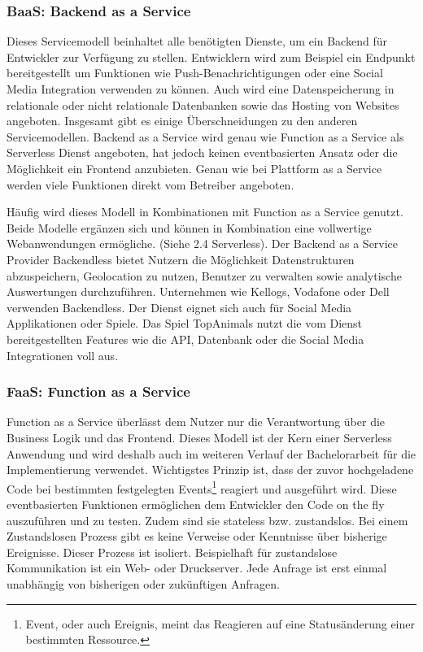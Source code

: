    \subsubsection{BaaS: Backend as a Service}
   Dieses Servicemodell beinhaltet alle benötigten Dienste, um ein Backend für Entwickler zur Verfügung zu stellen.
   Entwicklern wird zum Beispiel ein Endpunkt bereitgestellt um Funktionen wie Push-Benachrichtigungen oder eine Social Media Integration verwenden zu können.
   Auch wird eine Datenspeicherung in relationale oder nicht relationale Datenbanken sowie das Hosting von Websites angeboten. Insgesamt gibt es einige Überschneidungen zu den anderen Servicemodellen.
   Backend as a Service wird genau wie Function as a Service als Serverless Dienst angeboten, hat jedoch keinen eventbasierten Ansatz oder die Möglichkeit ein Frontend anzubieten.
   Genau wie bei Plattform as a Service werden viele Funktionen direkt vom Betreiber angeboten.

   Häufig wird dieses Modell in Kombinationen mit Function as a Service genutzt. Beide Modelle ergänzen sich und können in Kombination eine vollwertige
   Webanwendungen ermögliche. (Siehe 2.4 Serverless).
   Der Backend as a Service Provider Backendless bietet Nutzern die Möglichkeit Datenstrukturen abzuspeichern, Geolocation zu nutzen,
   Benutzer zu verwalten sowie analytische Auswertungen durchzuführen. Unternehmen wie Kellogs, Vodafone oder Dell verwenden Backendless.
   Der Dienst eignet sich auch für Social Media Applikationen oder Spiele. Das Spiel TopAnimals nutzt die vom Dienst bereitgestellten Features wie
   die API, Datenbank oder die Social Media Integrationen voll aus. \cite[]{Backendless}


   \subsubsection{FaaS: Function as a Service}
   \label{FaaS}
   Function as a Service überlässt dem Nutzer nur die Verantwortung über die Business Logik und das Frontend.
   Dieses Modell ist der Kern einer Serverless Anwendung und wird deshalb auch im weiteren Verlauf der Bachelorarbeit für die Implementierung
   verwendet.
   Wichtigstes Prinzip ist, dass der zuvor hochgeladene Code bei bestimmten festgelegten Events\footnote{Event, oder auch Ereignis, meint das Reagieren auf eine Statusänderung einer bestimmten Ressource.} reagiert und ausgeführt wird.
   Diese eventbasierten Funktionen ermöglichen dem Entwickler den Code on the fly auszuführen und zu testen.
   Zudem sind sie stateless bzw. zustandslos. Bei einem Zustandslosen Prozess gibt es keine Verweise oder Kenntnisse über bisherige Ereignisse.
   Dieser Prozess ist isoliert. Beispielhaft für zustandslose Kommunikation ist ein Web- oder Druckserver.
   Jede Anfrage ist erst einmal unabhängig von bisherigen oder zukünftigen Anfragen.\cite[]{Zustandslos}

